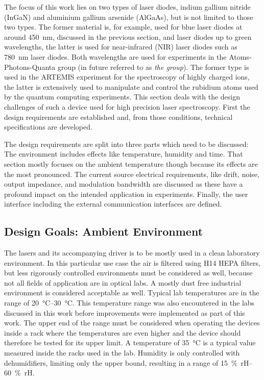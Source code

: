 The focus of this work lies on two types of laser diodes, indium gallium nitride (InGaN) and aluminium gallium arsenide (AlGaAs), but is not limited to those two types. The former material is, for example, used for blue laser diodes at around \qty{450}{\nm}, discussed in the previous section, and laser diodes up to green wavelengths, the latter is used for near-infrared (NIR) laser diodes such as \qty{780}{\nm} laser diodes. Both wavelengths are used for experiments in the Atoms-Photons-Quanta group (in future referred to as \textit{the group}). The former type is used in the ARTEMIS experiment for the spectroscopy of highly charged ions, the latter is extensively used to manipulate and control the rubidium atoms used by the quantum computing experiments. This section deals with the design challenges of such a device used for high precision laser spectroscopy. First the design requirements are established and, from those conditions, technical specifications are developed.

The design requirements are split into three parts which need to be discussed: The environment includes effects like temperature, humidity and time. That section mostly focuses on the ambient temperature though because its effects are the most pronounced. The current source electrical requirements, like drift, noise, output impedance, and modulation bandwidth are discussed as these have a profound impact on the intended application in experiments. Finally, the user interface including the external communication interfaces are defined.

\subsection{Design Goals: Ambient Environment}%
\label{sec:design_goal_environment}
The lasers and its accompanying driver is to be mostly used in a clean laboratory environment. In this particular use case the air is filtered using H14 HEPA filters, but less rigorously controlled environments must be considered as well, because not all fields of application are in optical labs. A mostly dust free industrial environment is considered acceptable as well. Typical lab temperatures are in the range of \qtyrange[range-phrase=\textup{~to~}]{20}{30}{\celsius}. This temperature range was also encountered in the labs discussed in this work before improvements were implemented as part of this work. The upper end of the range must be considered when operating the devices inside a rack where the temperatures are even higher and the device should therefore be tested for its upper limit. A temperature of \qty{35}{\celsius} is a typical value measured inside the racks used in the lab. Humidity is only controlled with dehumidifiers, limiting only the upper bound, resulting in a range of \qtyrange[range-phrase=\textup{~to~}]{15}{60}{\percent rH}.

